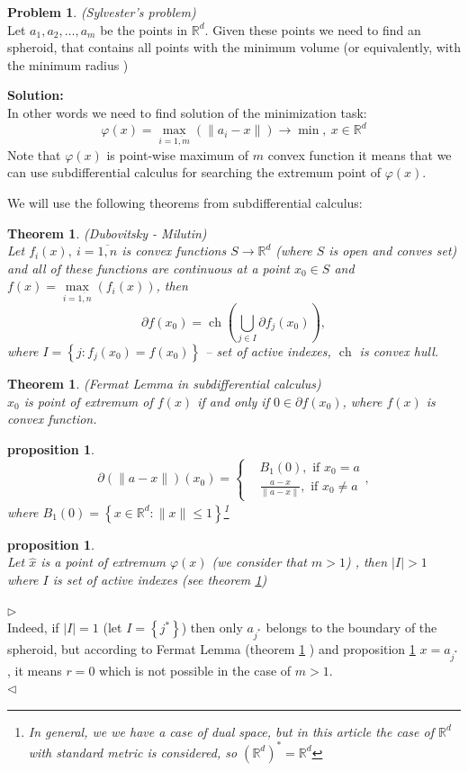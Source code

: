 \documentclass[a4paper, 12pt]{article}
\newcommand{\tit}[1]{%
\textit{#1}%
}
\newcommand{\tbf}[1]{%
\textbf{#1}%
}
\newcommand{\abs}[1]{%
\left| #1 \right|%
}
\newcommand{\br}[1]{%
\left( #1 \right)%
}
\newcommand{\figbr}[1]{%
\left\{ #1 \right\}%
}
\def\RR{\mathbb{R}}
\let\leq\leqslant
\let\phi\varphi
\newcounter{counterprop}
\newcounter{countertheorem}
\theoremstyle{plain} %
\newtheorem{theorem}[countertheorem]{Theorem}
\newtheorem{proposition}[counterprop]{proposition}
\theoremstyle{definition} %
\newtheorem*{problem}{Problem}
\theoremstyle{remark} %
\begin{document}
\begin{problem} \tit{(Sylvester's problem)} \\
Let $ a_1, a_2,  \dots , a_m $ be the points in $\RR^d$. Given these points we need to find an spheroid, that contains all points with the minimum volume (or equivalently, with the minimum radius )
\end{problem}
\noindent \tbf{Solution:} \\
In other words we need to find solution of the minimization task:
\begin{equation} \label{def: target function}
\phi(x) = \underset{i = \overline{1 , m } }{\max} \br{ \| a_i - x  \|   } \to \min, ~ x \in \RR^d
\end{equation}
Note that $\phi(x)$ is point-wise maximum of $m$ convex function it means that we can use subdifferential calculus for searching the extremum point of $\phi(x)$.

We will use the following theorems from subdifferential  calculus:
\begin{theorem} \label{th: D-M theorem}
\tit{(Dubovitsky - Milutin)}\\
Let $f_i(x), ~ i = \overline{1, n} $ is convex functions $S \to \RR^d$ (where $S$ is open and conves set) and all of these functions are continuous at a point $x_0 \in S $ and $f(x) = \underset{i = \overline{1, n} }{\max} (f_i (x)) $, then
$$
\partial f(x_0) = \mathop{ch} \br{ \bigcup_{j \in I} \partial f_j(x_0)  },
$$  
where $I = \figbr{j : f_j (x_0) = f(x_0)}$ -- set of active indexes,  $\mathop{ch}$ is convex hull.
\end{theorem}
\begin{theorem} \label{th: FL}
\tit{(Fermat Lemma in subdifferential  calculus)}\\
$x_0$ is point of extremum of $f(x)$ if and only if $0 \in \partial f(x_0)$, where $f(x)$ is convex function.
\end{theorem}
\begin{proposition} \label{pr: subdif of norm}
$$
\partial \br{ \| a - x \|} \br{x_0} = \left\{ 
\begin{aligned} 
& B_1(0), \text{ if } x_0 = a \\
& \frac{a-x}{\| a-x \|}, \text{ if } x_0 \neq a
\end{aligned} \right. ,
$$
where $B_1(0) = \figbr{ x \in \RR^d : \| x \| \leq 1 }$\footnote{In general, we we have a case of dual space, but in this article the case of $\RR^d$ with standard metric is considered, so $ \br{\RR^d}^* = \RR^d $} 
\end{proposition}
\begin{proposition} ~\\
Let $\hat{x}$ is a point of extremum $\phi(x)$ (we consider that $m>1$) , then $\abs{I} > 1$ where $I$ is set of active indexes (see theorem \ref{th: D-M theorem})
\end{proposition}
\noindent $\rhd$ \\
Indeed, if $\abs{I} = 1$ (let $I =\figbr{j^*}$) then only $a_{j^*}$ belongs to the boundary of the spheroid, but according to Fermat Lemma (theorem \ref{th: FL} ) and proposition \ref{pr: subdif of norm}  $ x = a_{j^*}$, it means $r=0$ which is not possible in the case of $m>1$. \\
$\lhd$
\end{document}

